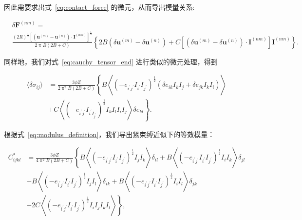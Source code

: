 因此需要求出式~\eqref{eq:contact_force} 的微元，从而导出模量关系:

\begin{equation}
  \begin{aligned}
  &\delta\mathbf{F}^{(nm)} =\\
  &\frac{(2R)^{\frac{1}{2}}\left[\left(\mathbf{u}^{(m)} - \mathbf{u}^{(n)}\right)\cdot\mathbf{I}^{(nm)}\right]^{\frac{1}{2}}}{2\uppi B(2B+C)}\left\{2B\left(\delta\mathbf{u}^{(m)} - \delta\mathbf{u}^{(n)}\right) + C\left[\left(\delta\mathbf{u}^{(m)} - \delta\mathbf{u}^{(n)}\right)\cdot\mathbf{I}^{(nm)}\right]\mathbf{I}^{(nm)}\right\}.
  \end{aligned}
\end{equation}

同样地，我们对式~\eqref{eq:cauchy_tensor_end} 进行类似的微元处理，得到

\begin{equation}
  \begin{aligned}
  \langle\delta\sigma_{ij}\rangle &= \frac{3\phi Z}{2\uppi^{2}B(2B+C)}\left\{B\left\langle\left(-e_{i^{\prime}j^{\prime}}I_{i^{\prime}}I_{j^{\prime}}\right)^{\frac{1}{2}}\left(\delta e_{ik}I_{k}I_{j} + \delta e_{jk}I_{k}I_{i}\right)\right\rangle\right.\\
  &+\left.C\left\langle\left(-e_{i^{\prime}j^{\prime}}I_{i^{\prime}I_{j^{\prime}}}\right)^{\frac{1}{2}}I_{k}I_{l}I_{i}I_{j}\right\rangle\delta e_{kl}\right\}.
  \end{aligned}
\end{equation}

根据式~\eqref{eq:modulus_definition}，我们导出紧束缚近似下的等效模量：

\begin{equation}
  \begin{aligned}
    C_{ijkl}^{*} &= \frac{3\phi Z}{4\uppi^{2}B(2B+C)}\left\{B\left\langle\left(-e_{i^{\prime}j^{\prime}}I_{i^{\prime}}I_{j^{\prime}}\right)^{\frac{1}{2}}I_{j}I_{k}\right\rangle\delta_{il} +  B\left\langle\left(-e_{i^{\prime}j^{\prime}}I_{i^{\prime}}I_{j^{\prime}}\right)^{\frac{1}{2}}I_{i}I_{k}\right\rangle\delta_{jl} \right.\\
    &+B\left\langle\left(-e_{i^{\prime}j^{\prime}}I_{i^{\prime}}I_{j^{\prime}}\right)^{\frac{1}{2}}I_{j}I_{l}\right\rangle\delta_{ik}+ B\left\langle\left(-e_{i^{\prime}j^{\prime}}I_{i^{\prime}}I_{j^{\prime}}\right)^{\frac{1}{2}}I_{i}I_{l}\right\rangle\delta_{jk}\\
    &\left. + 2C\left\langle\left(-e_{i^{\prime}j^{\prime}}I_{i^{\prime}}I_{j^{\prime}}\right)^{\frac{1}{2}}I_{i}I_{j}I_{k}I_{l}\right\rangle\right\},
  \end{aligned}\label{eq:effective_moduli}
\end{equation}

